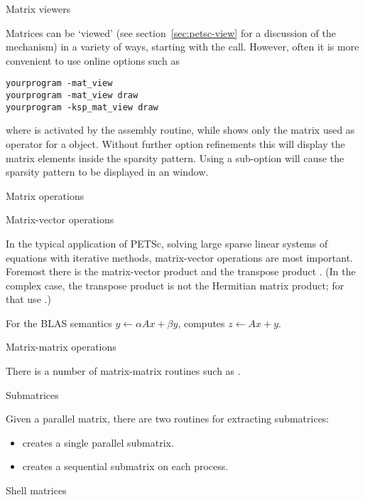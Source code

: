  {Matrix viewers}

Matrices can be `viewed'
(see section~\ref{sec:petsc-view} for a discussion of the  mechanism)
in a variety of ways, starting with the  call.
However, often it is more convenient to use online options such as
\begin{verbatim}
yourprogram -mat_view
yourprogram -mat_view draw
yourprogram -ksp_mat_view draw
\end{verbatim}
where  is activated by the assembly routine,
while  shows only the matrix used as
operator for a  object.
Without further option refinements this will display
the matrix elements inside the sparsity pattern.
Using a sub-option  will cause the sparsity pattern to be
displayed in an  window.

 {Matrix operations}

 {Matrix-vector operations}

In the typical application of PETSc, solving large sparse linear
systems of equations with iterative methods, matrix-vector operations
are most important. Foremost there is the matrix-vector product
 and the transpose product
.
(In the complex case, the transpose product is not the Hermitian
matrix product; for that use .)

For the \ac{BLAS}  semantics
$y\leftarrow \alpha Ax + \beta y$,
 computes
$z\leftarrow Ax +y $.

 {Matrix-matrix operations}

There is a number of matrix-matrix routines such as
.

 {Submatrices}
\label{sec:petsc-submat}

Given a parallel matrix, there are two routines for extracting submatrices:
\begin{itemize}
\item {} creates a single parallel
  submatrix.
\item {} creates a sequential
  submatrix on each process.
\end{itemize}

 {Shell matrices}
\label{sec:mat-shell}

